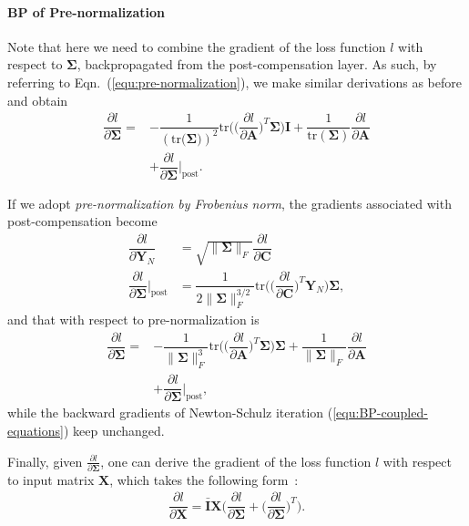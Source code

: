 \documentclass[10pt,twocolumn,letterpaper]{article}
\begin{document}
\paragraph{BP of Pre-normalization} Note that here we need to combine the gradient of the loss function $l$ with respect to $\boldsymbol{\Sigma}$, backpropagated from the post-compensation layer. As such, by referring to Eqn.~(\ref{equ:pre-normalization}), we make similar derivations as before and obtain 
\begin{align}\label{equ:BP-pre-trace}
\dfrac{\partial l}{\partial \boldsymbol{\Sigma}}=&-\dfrac{1}{({\mathrm{tr}(\boldsymbol{\Sigma)}})^2}\mathrm{tr}\Big(\Big(\dfrac{\partial l}{\partial \mathbf{A}}\Big)^{T}\boldsymbol{\Sigma}\Big)\mathbf{I}+\dfrac{1}{\mathrm{tr}(\boldsymbol{\boldsymbol{\Sigma}})}\dfrac{\partial l}{\partial \mathbf{A}}\nonumber\\
&+\dfrac{\partial l}{\partial \boldsymbol{\Sigma}}\Big|_{\mathrm{post}}.
\end{align}

If we adopt \textit{pre-normalization by Frobenius norm}, the gradients associated with post-compensation  become
\begin{align}\label{equ:BP-post-fro}
\dfrac{\partial l}{\partial \mathbf{Y}_{N}}&=\sqrt{\|\boldsymbol{\Sigma}\|_{F}}\dfrac{\partial l}{\partial \mathbf{C}} \nonumber \\
\dfrac{\partial l}{\partial \boldsymbol{\Sigma}}\Big|_{\mathrm{post}}&=\dfrac{1}{2\|\boldsymbol{\Sigma}\|_{F}^{3/2}}\mathrm{tr}\Big(\Big(\dfrac{\partial l}{\partial \mathbf{C}}\Big)^{T}\mathbf{Y}_{N}\Big)\boldsymbol{\Sigma},
\end{align}
and that with respect to  pre-normalization  is
\begin{align}\label{equ:BP-pre-trace}
\dfrac{\partial l}{\partial \boldsymbol{\Sigma}}=&-\dfrac{1}{\|\boldsymbol{\Sigma}\|_{F}^{3}}\mathrm{tr}\Big(\Big(\dfrac{\partial l}{\partial \mathbf{A}}\Big)^{T}\boldsymbol{\Sigma}\Big)\boldsymbol{\Sigma}+\dfrac{1}{\|\boldsymbol{\Sigma}\|_{F}}\dfrac{\partial l}{\partial \mathbf{A}}\nonumber\\
&+\dfrac{\partial l}{\partial \boldsymbol{\Sigma}}\Big|_{\mathrm{post}},
\end{align}
while the backward gradients of Newton-Schulz iteration (\ref{equ:BP-coupled-equations}) keep unchanged.

Finally, given $\frac{\partial l}{\partial \boldsymbol{\Sigma}}$, one can derive the gradient of the loss function $l$ with respect to  input matrix $\mathbf{X}$, which takes the following form~\cite{Li_2017_ICCV}:
\begin{align}\label{equ:compute-cov-backward}
\dfrac{\partial l}{\partial \mathbf{X}}=\bar{\mathbf{I}}\mathbf{X}\bigg(\dfrac{\partial l}{\partial \boldsymbol{\Sigma}}+\bigg(\dfrac{\partial l}{\partial \boldsymbol{\Sigma}}\bigg)^{T}\bigg).
\end{align}
\end{document}

